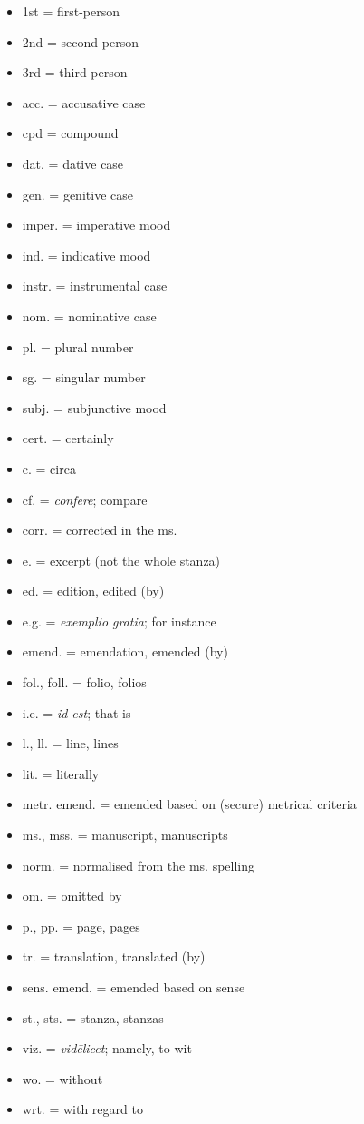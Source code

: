   \begin{itemize}%
    \item 1st = first-person
    \item 2nd = second-person
    \item 3rd = third-person
    \item acc. = accusative case
    \item cpd = compound
    \item dat. = dative case
    \item gen. = genitive case
    \item imper. = imperative mood
    \item ind. = indicative mood
    \item instr. = instrumental case
    \item nom. = nominative case
    \item pl. = plural number
    \item sg. = singular number
    \item subj. = subjunctive mood
  \end{itemize}

  \begin{itemize}%
    \item cert. = certainly
    \item c. = circa
    \item cf. = \emph{confere}; compare
    \item corr. = corrected in the ms.
    \item e. = excerpt (not the whole stanza)
    \item ed. = edition, edited (by)
    \item e.g. = \emph{exemplio gratia}; for instance
    \item emend. = emendation, emended (by)
    \item fol., foll. = folio, folios
    \item i.e. = \emph{id est}; that is
    \item l., ll. = line, lines
    \item lit. = literally
    \item metr. emend. = emended based on (secure) metrical criteria
    \item ms., mss. = manuscript, manuscripts
    \item norm. = normalised from the ms. spelling
    \item om. = omitted by
    \item p., pp. = page, pages
    \item tr. = translation, translated (by)
    \item sens. emend. = emended based on sense
    \item st., sts. = stanza, stanzas
    \item viz. = \emph{vidēlicet}; namely, to wit
    \item wo. = without
    \item wrt. = with regard to
  \end{itemize}

